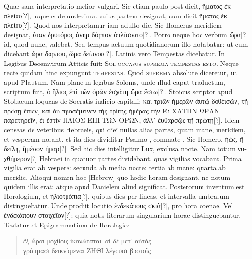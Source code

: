 Quae sane interpretatio melior vulgari.
Sic etiam paulo post dicit,
\textgreek{ἤματος ἐκ πλείου[?]}, loquens de undecima: cuius partem designat,
 cum dicit
\textgreek{ἤματος ἐκ πλείου[?]}.
Quod nos interpretamur iam adulto die.
Sic Homerus
meridiem designat, \textgreek{ὅταν δρυτόμος ἀνὴρ δόρπον ὁπλίσσατο[?]}.
Porro neque
hoc verbum \textgreek{ὥρα[?]} id, quod nunc, valebat.
Sed tempus actuum quotidianorum
illo notabatur: ut cum dicebant \textgreek{ὥρα δόρπου, ὥρα δείπνου[?]}.
Latinis
vero Tempestas dicebatur.
In Legibus Decemvirum Atticis fuit:
\textsc{Sol occasus suprema tempestas esto}.
Neque recte
quidam hinc expungunt \textsc{tempestas}.
Quod \textsc{suprema} absolute
diceretur, ut apud Plautum.
Nam plane in legibus Solonis, unde illud
caput traductum, scriptum fuit,
 \textgreek{ὁ ἥλιος ἐπὶ τῶν ὀρῶν ἐσχάτη ὥρα ἔστω[?]}.
Stoicus
scriptor apud Stobaeum loquens de Socratis iudicio capitali: 
\textgreek{καὶ
τριῶν ἡμερῶν ἀυτῷ δοθέισῶν, τῇ πρώτῃ ἔπιεν,
 καὶ ὀυ προσέμεινεν τὴς τρίτης ἡμέρας τὴν
ΕΣΧΑΤΗΝ ΩΡΑΝ παρατηρεῖν, ἐι ἐστὶν ΗΛΙΟΣ ΕΠΙ ΤΩΝ
ΟΡΩΝ, ἀλλ᾽ ἐυθαρσῷς τῇ πρώτῃ[?]}.
Idem censeas de veteribus Hebraeis,
qui diei nullas alias partes, quam mane, meridiem, et vesperam norant.
et ita dies dividitur Psalmo , commate .
%
Sic Homero,
\textgreek{ἠὼς, ἢ δείλη, ἢμέσον ἦμαρ[?]}.
Sed hic dies intelligitur Lux, exclusa nocte.
Nam totum \textgreek{νυχθήμερον[?]} Hebraei in quatuor partes
 dividebant, quas vigilias
vocabant.
Prima vigilia erat ab vespere: secunda ab media nocte:
tertia ab mane: quarta ab meridie.
Alioqui nomen hoc \texthebrew{[Hebrew]} quo hodie
horam designant, ne notum quidem illis erat: atque apud Danielem
aliud significat.
Posterorum inventum est Horologium, et \textgreek{ἡλιοτρόπια[?]},
quibus dies per lineas, et intervalla umbrarum distinguebatur.
Unde prodiit locutio \textgreek{ἑνδεκάπους σκιὰ[?]}, pro hora coenae.
Vel \textgreek{ἑνδεκάπουν στοιχεῖον[?]}:
quia notis literarum singularium horae distinguebantur.
Testatur et Epigrammatium de Horologio:
\begin{verse}
\textgreek{ἓξ ὧραι μόχθοις ἱκανώταται. αἱ δὲ μετ᾽ αὐτὰς}\\
\textgreek{γράμμασι δεικνύμεναι ΖΗΘΙ λέγουσι βροτοῖς}
\end{verse}
